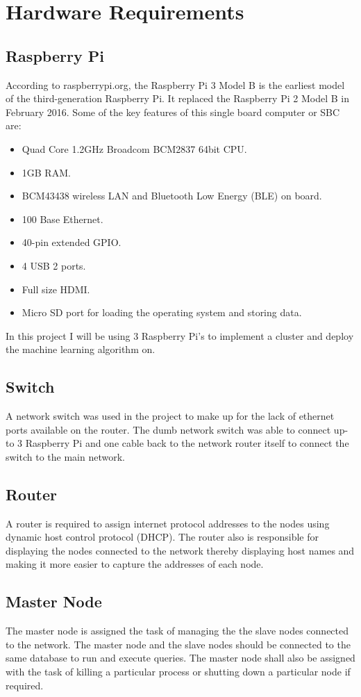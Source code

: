\documentclass[12pt]{article}
\begin{document}
\newpage
\section{Hardware Requirements}
\subsection{Raspberry Pi}

According to raspberrypi.org, the Raspberry Pi 3 Model B is the earliest model of the third-generation Raspberry Pi. It replaced the Raspberry Pi 2 Model B in February 2016. Some of the key features of this single board computer or SBC are:
\begin{itemize}
\item Quad Core 1.2GHz Broadcom BCM2837 64bit CPU.
\item 1GB RAM.
\item BCM43438 wireless LAN and Bluetooth Low Energy (BLE) on board.
\item 100 Base Ethernet.
\item 40-pin extended GPIO.
\item 4 USB 2 ports.
\item Full size HDMI.
\item Micro SD port for loading the operating system and storing data.
\end{itemize}
In this project I will be using 3 Raspberry Pi's to implement a cluster and deploy the machine learning algorithm on.

\subsection{Switch}
A network switch was used in the project to make up for the lack of ethernet ports available on the router. The dumb network switch 
was able to connect up-to 3 Raspberry Pi and one cable back to the network router itself to connect the switch to the main network.

\subsection{Router}
A router is required to assign internet protocol addresses to the nodes using dynamic host control protocol (DHCP). The router also is responsible for displaying the nodes connected to the network thereby displaying host names and making it more easier to capture the addresses of each node.

\subsection{Master Node}
The master node is assigned the task of managing the the slave nodes connected to the network. The master node and the slave nodes should be connected to the same database to run and execute queries. The master node shall also be assigned with the task of killing a particular process or shutting down a particular node if required.
\end{document}
